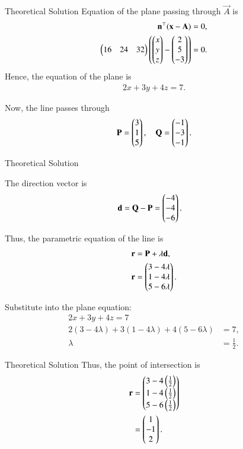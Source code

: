 \documentclass{beamer}
\begin{document}
\begin{frame}{Theoretical Solution }
Equation of the plane passing through $\vec{A}$ is
\begin{align}
\mathbf{n}^\top (\mathbf{x} - \mathbf{A}) &= 0, \\
\begin{pmatrix}16 & 24 & 32\end{pmatrix} \left( \begin{pmatrix}x \\ y \\ z\end{pmatrix} - \begin{pmatrix}2 \\ 5 \\ -3\end{pmatrix} \right) &= 0.\nonumber
\end{align}
Hence, the equation of the plane is
\begin{align}
2x + 3y + 4z = 7.
\end{align}

Now, the line passes through 
\begin{align}
  \mathbf{P} = \begin{pmatrix}3 \\ 1 \\ 5\end{pmatrix}, \quad \mathbf{Q} = \begin{pmatrix}-1 \\ -3 \\ -1\end{pmatrix}.  
\end{align}
\end{frame}
\begin{frame}{Theoretical Solution }

The direction vector is
\begin{align}
\mathbf{d} &= \mathbf{Q} - \mathbf{P} = \begin{pmatrix}-4 \\ -4 \\ -6\end{pmatrix}.
\end{align}

Thus, the parametric equation of the line is
\begin{align}
\mathbf{r} &= \mathbf{P} + \lambda \mathbf{d}, \\
\mathbf{r} &= \begin{pmatrix}3 - 4\lambda \\ 1 - 4\lambda \\ 5 - 6\lambda\end{pmatrix}.
\end{align}

Substitute into the plane equation:
\begin{align} 
2x + 3y + 4z = 7\\
2(3 - 4\lambda) + 3(1 - 4\lambda) + 4(5 - 6\lambda) &= 7, \\
\lambda &= \tfrac{1}{2}.
\end{align}
\end{frame}
\begin{frame}{Theoretical Solution }
Thus, the point of intersection is
\begin{align}
\mathbf{r} &= \begin{pmatrix}3 - 4\left(\tfrac{1}{2}\right) \\ 1 - 4\left(\tfrac{1}{2}\right) \\ 5 - 6\left(\tfrac{1}{2}\right)\end{pmatrix} \\
&= \begin{pmatrix}1 \\ -1 \\ 2\end{pmatrix}.
\end{align}
\end{frame}
\end{document}
